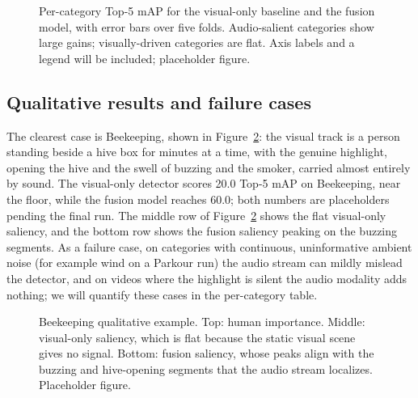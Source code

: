 \documentclass[10pt,twocolumn,letterpaper]{article}
\begin{document}
\begin{figure}[t]
\begin{center}
\fbox{\rule{0pt}{1.6in} \rule{0.9\linewidth}{0pt}}
\end{center}
   \caption{Per-category Top-5 mAP for the visual-only baseline and the fusion model, with error bars over five folds. Audio-salient categories show large gains; visually-driven categories are flat. Axis labels and a legend will be included; placeholder figure.}
\label{fig:bars}
\end{figure}

\subsection{Qualitative results and failure cases}
The clearest case is Beekeeping, shown in Figure~\ref{fig:bk}: the visual track is a person standing beside a hive box for minutes at a time, with the genuine highlight, opening the hive and the swell of buzzing and the smoker, carried almost entirely by sound. The visual-only detector scores 20.0 Top-5 mAP on Beekeeping, near the floor, while the fusion model reaches 60.0; both numbers are placeholders pending the final run. The middle row of Figure~\ref{fig:bk} shows the flat visual-only saliency, and the bottom row shows the fusion saliency peaking on the buzzing segments. As a failure case, on categories with continuous, uninformative ambient noise (for example wind on a Parkour run) the audio stream can mildly mislead the detector, and on videos where the highlight is silent the audio modality adds nothing; we will quantify these cases in the per-category table.

\begin{figure}[t]
\begin{center}
\fbox{\rule{0pt}{1.6in} \rule{0.9\linewidth}{0pt}}
\end{center}
   \caption{Beekeeping qualitative example. Top: human importance. Middle: visual-only saliency, which is flat because the static visual scene gives no signal. Bottom: fusion saliency, whose peaks align with the buzzing and hive-opening segments that the audio stream localizes. Placeholder figure.}
\label{fig:bk}
\end{figure}
\end{document}

